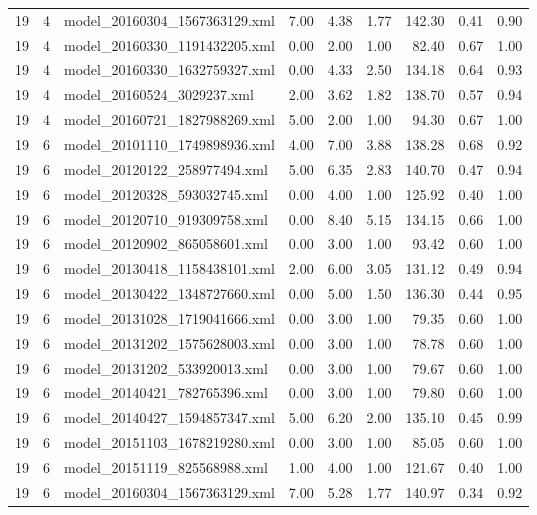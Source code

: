 \begin{table}[ht]
\begin{tabular}{rrlrrrrrr}
   19 &   4 & model\_20160304\_1567363129.xml & 7.00 & 4.38 & 1.77 & 142.30 & 0.41 & 0.90 \\ 
   19 &   4 & model\_20160330\_1191432205.xml & 0.00 & 2.00 & 1.00 & 82.40 & 0.67 & 1.00 \\ 
   19 &   4 & model\_20160330\_1632759327.xml & 0.00 & 4.33 & 2.50 & 134.18 & 0.64 & 0.93 \\ 
   19 &   4 & model\_20160524\_3029237.xml & 2.00 & 3.62 & 1.82 & 138.70 & 0.57 & 0.94 \\ 
   19 &   4 & model\_20160721\_1827988269.xml & 5.00 & 2.00 & 1.00 & 94.30 & 0.67 & 1.00 \\ 
   19 &   6 & model\_20101110\_1749898936.xml & 4.00 & 7.00 & 3.88 & 138.28 & 0.68 & 0.92 \\ 
   19 &   6 & model\_20120122\_258977494.xml & 5.00 & 6.35 & 2.83 & 140.70 & 0.47 & 0.94 \\ 
   19 &   6 & model\_20120328\_593032745.xml & 0.00 & 4.00 & 1.00 & 125.92 & 0.40 & 1.00 \\ 
   19 &   6 & model\_20120710\_919309758.xml & 0.00 & 8.40 & 5.15 & 134.15 & 0.66 & 1.00 \\ 
   19 &   6 & model\_20120902\_865058601.xml & 0.00 & 3.00 & 1.00 & 93.42 & 0.60 & 1.00 \\ 
   19 &   6 & model\_20130418\_1158438101.xml & 2.00 & 6.00 & 3.05 & 131.12 & 0.49 & 0.94 \\ 
   19 &   6 & model\_20130422\_1348727660.xml & 0.00 & 5.00 & 1.50 & 136.30 & 0.44 & 0.95 \\ 
   19 &   6 & model\_20131028\_1719041666.xml & 0.00 & 3.00 & 1.00 & 79.35 & 0.60 & 1.00 \\ 
   19 &   6 & model\_20131202\_1575628003.xml & 0.00 & 3.00 & 1.00 & 78.78 & 0.60 & 1.00 \\ 
   19 &   6 & model\_20131202\_533920013.xml & 0.00 & 3.00 & 1.00 & 79.67 & 0.60 & 1.00 \\ 
   19 &   6 & model\_20140421\_782765396.xml & 0.00 & 3.00 & 1.00 & 79.80 & 0.60 & 1.00 \\ 
   19 &   6 & model\_20140427\_1594857347.xml & 5.00 & 6.20 & 2.00 & 135.10 & 0.45 & 0.99 \\ 
   19 &   6 & model\_20151103\_1678219280.xml & 0.00 & 3.00 & 1.00 & 85.05 & 0.60 & 1.00 \\ 
   19 &   6 & model\_20151119\_825568988.xml & 1.00 & 4.00 & 1.00 & 121.67 & 0.40 & 1.00 \\ 
   19 &   6 & model\_20160304\_1567363129.xml & 7.00 & 5.28 & 1.77 & 140.97 & 0.34 & 0.92 \\ 

\end{tabular}
\end{table}
